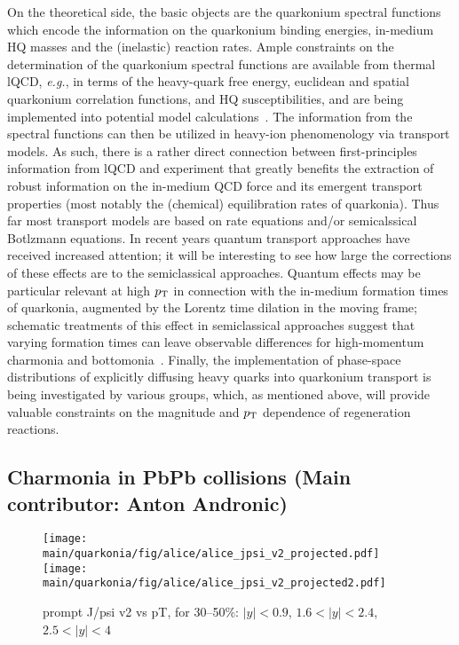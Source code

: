 \documentclass[../report.tex]{subfiles}
\providecommand{\main}{..}
\providecommand{\pt}{\ensuremath{p_\text{T}}\Xspace}
\begin{document}
On the theoretical side, the basic objects are the quarkonium spectral functions which 
encode the information on the quarkonium binding energies, in-medium HQ masses and the
(inelastic) reaction rates. Ample constraints on the determination of the quarkonium
spectral functions are available from thermal lQCD, {\it e.g.}, in terms of the heavy-quark
free energy, euclidean and spatial quarkonium correlation functions, and HQ susceptibilities,
and are being implemented into potential model 
calculations~\cite{Wong:2004zr,Mocsy:2005qw,Alberico:2006vw,Brambilla:2008cx,Riek:2010py,Burnier:2015tda,Liu:2017qah}.
The information from the spectral functions can then be utilized in heavy-ion phenomenology
via transport models. As such, there is a rather direct connection between first-principles
information from lQCD and experiment that greatly benefits the extraction of robust information 
on the in-medium QCD force and its emergent transport properties (most notably the (chemical)
equilibration rates of quarkonia). 
Thus far most transport models are based on rate equations and/or
semicalssical Botlzmann equations. In recent years quantum transport approaches have 
received increased attention; it will be interesting to see how large the corrections
of these effects are to the semiclassical approaches. Quantum effects may be particular 
relevant at high $\pt$ in connection with the in-medium formation times of quarkonia, 
augmented by the Lorentz time dilation in the moving frame; schematic treatments of
this effect in semiclassical approaches suggest that varying formation times can leave 
observable differences for high-momentum charmonia and 
bottomonia~\cite{Song:2015bja,Hoelck:2016tqf,Du:2017qkv,Aronson:2017ymv,Krouppa:2017jlg}. 
Finally, the implementation of phase-space distributions of explicitly diffusing heavy quarks 
into quarkonium transport is being investigated by various groups, which, as mentioned above, 
will provide valuable constraints on the magnitude and $\pt$ dependence of regeneration 
reactions.   

\subsection{Charmonia in PbPb collisions (Main contributor: Anton Andronic)}


\begin{figure}

\begin{center}
 \texttt{[image: \\main/quarkonia/fig/alice/alice\_jpsi\_v2\_projected.pdf]}
 \texttt{[image: \\main/quarkonia/fig/alice/alice\_jpsi\_v2\_projected2.pdf]}
\end{center}

 \caption{prompt J/psi v2 vs pT, for 30--50\%: $|y|<0.9$, $1.6<|y|<2.4$, $2.5<|y|<4$~\cite{Abelev:1475243,CERN-LHCC-2013-014}}
\end{figure}
\end{document}

